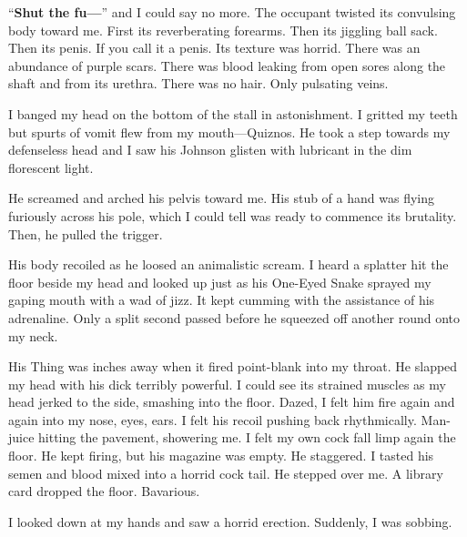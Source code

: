 ``{\bf Shut the fu---}'' and I could say no more. The occupant
twisted its convulsing body toward me. First its reverberating
forearms. Then its jiggling ball sack. Then its penis. If you call
it a penis. Its texture was horrid. There was an abundance of
purple scars. There was blood leaking from open sores along the
shaft and from its urethra. There was no hair. Only pulsating
veins.



I banged my head on the bottom of the stall in astonishment. I
gritted my teeth but spurts of vomit flew from my
mouth---Quiznos. He took a step towards my defenseless head and
I saw his Johnson glisten with lubricant in the dim florescent
light.



He screamed and arched his pelvis toward me. His stub of a hand was
flying furiously across his pole, which I could tell was ready to
commence its brutality. Then, he pulled the trigger.



His body recoiled as he loosed an animalistic scream. I heard a
splatter hit the floor beside my head and looked up just as his
One-Eyed Snake sprayed my gaping mouth with a wad of jizz. It kept
cumming with the assistance of his adrenaline. Only a split second
passed before he squeezed off another round onto my neck.



His Thing was inches away when it fired point-blank into my throat.
He slapped my head with his dick terribly powerful. I could see its
strained muscles as my head jerked to the side, smashing into the
floor. Dazed, I felt him fire again and again into my nose, eyes,
ears. I felt his recoil pushing back rhythmically. Man-juice
hitting the pavement, showering me. I felt my own cock fall limp
again the floor. He kept firing, but his magazine was empty. He
staggered. I tasted his semen and blood mixed into a horrid cock
tail. He stepped over me. A library card dropped the floor.
Bavarious.



I looked down at my hands and saw a horrid erection. Suddenly, I
was sobbing. 
 



